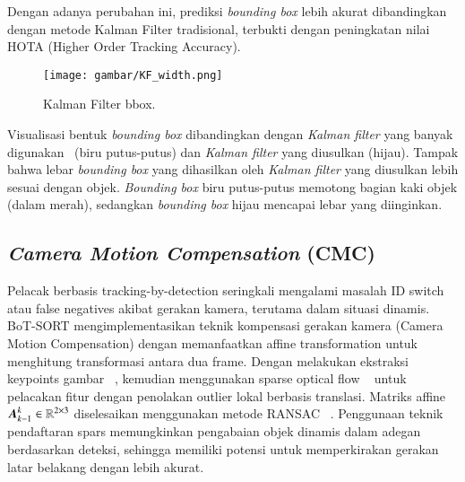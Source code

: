 Dengan adanya perubahan ini, prediksi \emph{bounding box} lebih akurat dibandingkan dengan metode Kalman Filter tradisional, terbukti dengan peningkatan nilai HOTA (Higher Order Tracking Accuracy).

\begin{figure}[H]
  \centering
  \texttt{[image: gambar/KF\_width.png]}
  \caption{Kalman Filter bbox.}
  \label{fig:KF width}
\end{figure}

Visualisasi bentuk \emph{bounding box} dibandingkan dengan \emph{Kalman filter} yang banyak digunakan~\parencite{wojke2017simple} (biru putus-putus) dan \emph{Kalman filter} yang diusulkan (hijau). Tampak bahwa lebar \emph{bounding box} yang dihasilkan oleh \emph{Kalman filter} yang diusulkan lebih sesuai dengan objek. \emph{Bounding box} biru putus-putus memotong bagian kaki objek (dalam merah), sedangkan \emph{bounding box} hijau mencapai lebar yang diinginkan.

\subsection{\emph{Camera Motion Compensation} (CMC)}

Pelacak berbasis tracking-by-detection seringkali mengalami masalah ID switch atau false negatives akibat gerakan kamera, terutama dalam situasi dinamis. BoT-SORT mengimplementasikan teknik kompensasi gerakan kamera (Camera Motion Compensation) dengan memanfaatkan affine transformation untuk menghitung transformasi antara dua frame. Dengan melakukan ekstraksi keypoints gambar ~\cite{shi1994good}, kemudian menggunakan sparse optical flow ~\cite{Bouguet1999PyramidalIO} untuk pelacakan fitur dengan penolakan outlier lokal berbasis translasi. Matriks affine $\vb*{A}_{k-1}^k\in \mathbb{R}^{2 \times 3}$ diselesaikan menggunakan metode RANSAC ~\cite{fischler1981random}. Penggunaan teknik pendaftaran spars memungkinkan pengabaian objek dinamis dalam adegan berdasarkan deteksi, sehingga memiliki potensi untuk memperkirakan gerakan latar belakang dengan lebih akurat.

